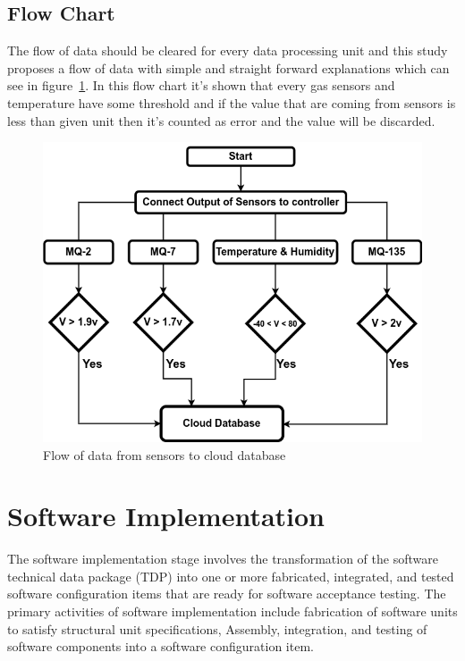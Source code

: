 \subsection{Flow Chart}

The flow of data should be cleared for every data processing unit and this study proposes a flow of data with simple and straight forward explanations which can see in figure~\ref{img42}. In this flow chart it's shown that every gas sensors and temperature have some threshold and if the value that are coming from sensors is less than given unit then it's counted as error and the value will be discarded.

\begin{figure}[!ht]
\centering
\includegraphics[width=\linewidth]{figures/flow-chart.png}
\caption{\label{img42} Flow of data from sensors to cloud database}
\end{figure}



\section{Software Implementation}

The software implementation stage involves the transformation of the software technical data package (TDP) into one or more fabricated, integrated, and tested software configuration items that are ready for software acceptance testing. The primary activities of software implementation include fabrication of software units to satisfy structural unit specifications, Assembly, integration, and testing of software components into a software configuration item.


